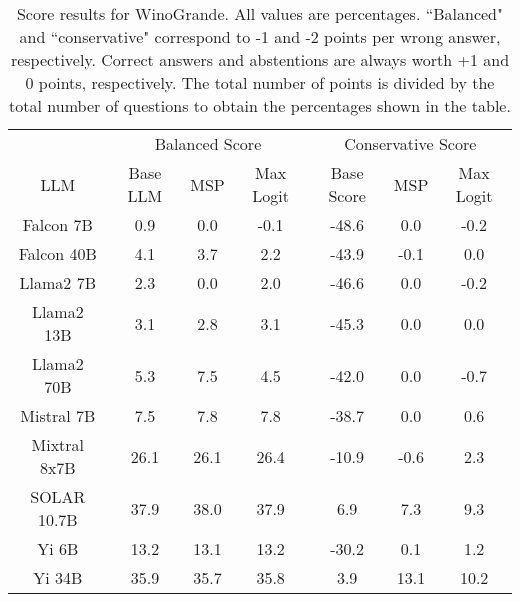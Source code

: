 \renewcommand\arraystretch{1.2}
\begin{table*}
\centering
\begin{tabular}{c|c|c|c|c|c|c}
& \multicolumn{3}{c|}{Balanced Score} & \multicolumn{3}{c}{Conservative Score} \\ 
LLM & Base LLM & MSP & Max Logit & Base Score & MSP & Max Logit\\ \hline
Falcon 7B & 0.9 & 0.0 & -0.1 & -48.6 & 0.0 & -0.2\\
Falcon 40B & 4.1 & 3.7 & 2.2 & -43.9 & -0.1 & 0.0\\
Llama2 7B & 2.3 & 0.0 & 2.0 & -46.6 & 0.0 & -0.2\\
Llama2 13B & 3.1 & 2.8 & 3.1 & -45.3 & 0.0 & 0.0\\
Llama2 70B & 5.3 & 7.5 & 4.5 & -42.0 & 0.0 & -0.7\\
Mistral 7B & 7.5 & 7.8 & 7.8 & -38.7 & 0.0 & 0.6\\
Mixtral 8x7B & 26.1 & 26.1 & 26.4 & -10.9 & -0.6 & 2.3\\
SOLAR 10.7B & 37.9 & 38.0 & 37.9 & 6.9 & 7.3 & 9.3\\
Yi 6B & 13.2 & 13.1 & 13.2 & -30.2 & 0.1 & 1.2\\
Yi 34B & 35.9 & 35.7 & 35.8 & 3.9 & 13.1 & 10.2\\
\hline
\end{tabular}
\caption{Score results for WinoGrande. All values are percentages. ``Balanced" and ``conservative" correspond to -1 and -2 points per wrong answer, respectively. Correct answers and abstentions are always worth +1 and 0 points, respectively. The total number of points is divided by the total number of questions to obtain the percentages shown in the table.}
\label{tab:winogrande_score}
\end{table*}
